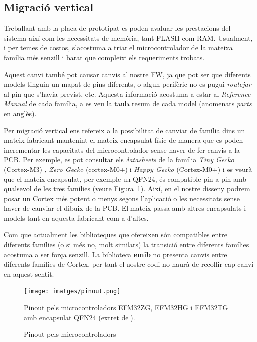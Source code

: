 \subsection{Migració vertical}
Treballant amb la placa de prototipat es poden avaluar les prestacions del sistema així com les necessitats de memòria, tant \gls{FLASH} com \gls{RAM}. Usualment, i per temes de costos, s'acostuma a triar el microcontrolador de la mateixa família més senzill i barat que compleixi els requeriments trobats.

Aquest canvi també pot causar canvis al nostre \gls{FW}, ja que pot ser que diferents models tinguin un mapat de pins diferents, o algun perifèric no es pugui {\em routejar} al pin que s'havia previst, etc. Aquesta informació acostuma a estar al {\em Reference Manual} de cada família, a \cite[8]{EFM32TGRM} es veu la taula resum de cada model (anomenats {\em parts} en anglès).

Per migració vertical ens refereix a la possibilitat de canviar de família dins un mateix fabricant mantenint el mateix encapsulat físic de manera que es poden incrementar les capacitats del microcontrolador sense haver de fer canvis a la \gls{PCB}.
Per exemple, es pot consultar els {\em datasheets} de la família {\em Tiny Gecko} (Cortex-M3) \cite[72]{EFM32TGDS}, {\em Zero Gecko} (cortex-M0+) \cite[66]{EFM32ZGDS} i {\em Happy Gecko} (Cortex-M0+)\cite[76]{EFM32HGDS} i es veurà que el mateix encapsulat, per exemple un QFN24, és compatible pin a pin amb qualsevol de les tres famílies (veure Figura~\ref{fig:pinout}). Així, en el nostre disseny podrem posar un Cortex més potent o menys segons l'aplicació o les necessitats sense haver de canviar el dibuix de la PCB. El mateix passa amb altres encapsulats i models tant en aquesta fabricant com a d'altes.

Com que actualment les biblioteques que ofereixen són compatibles entre diferents famílies (o si més no, molt similars) la transició entre diferents famílies acostuma a ser força senzill. La biblioteca {\bf emib} no presenta canvis entre diferents famílies de Cortex, per tant el nostre codi no haurà de recollir cap canvi en aquest sentit.

\begin{figure}[b]
 \centering
 \texttt{[image: imatges/pinout.png]}
 \caption{Pinout pels microcontroladors}{Pinout pels microcontroladors EFM32ZG, EFM32HG i EFM32TG amb encapsulat QFN24 (extret de \cite[72]{EFM32TGDS}).}
 \label{fig:pinout}
\end{figure}


